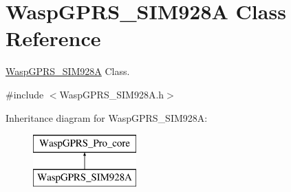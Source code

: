 \hypertarget{class_wasp_g_p_r_s___s_i_m928_a}{}\section{Wasp\+G\+P\+R\+S\+\_\+\+S\+I\+M928A Class Reference}
\label{class_wasp_g_p_r_s___s_i_m928_a}


\hyperlink{class_wasp_g_p_r_s___s_i_m928_a}{Wasp\+G\+P\+R\+S\+\_\+\+S\+I\+M928A} Class.  




{\ttfamily \#include $<$Wasp\+G\+P\+R\+S\+\_\+\+S\+I\+M928\+A.\+h$>$}

Inheritance diagram for Wasp\+G\+P\+R\+S\+\_\+\+S\+I\+M928A\+:\begin{figure}[H]
\begin{center}
\leavevmode
\includegraphics[height=2.000000cm]{class_wasp_g_p_r_s___s_i_m928_a}
\end{center}
\end{figure}
